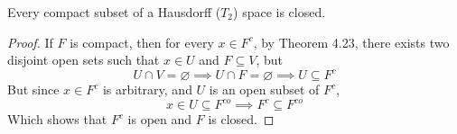 \documentclass[../../main.tex]{subfiles}
\begin{document}
\begin{wts}
Every compact subset of a Hausdorff ($T_2$) space is closed.
\end{wts}
\begin{proof}
If $F$ is compact, then for every $x\in F^c$, by Theorem 4.23, there exists two disjoint open sets such that $x\in U$ and $F\subseteq V$, but 
\[
U\cap V = \varnothing\implies U\cap F=\varnothing\implies U\subseteq F^c
\]
But since $x\in F^c$ is arbitrary, and $U$ is an open subset of $F^c$, 
\[
x\in U\subseteq F^{co}\implies F^c\subseteq F^{co}
\]
Which shows that $F^c$ is open and $F$ is closed.
\end{proof}
\end{document}
